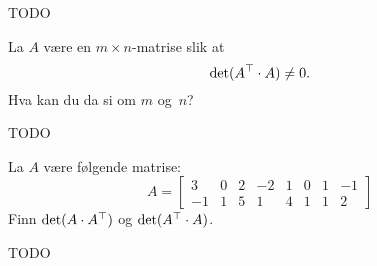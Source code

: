 \begin{losning}
TODO
\end{losning}


\begin{oppgave}
La $A$ være en $m \times n$-matrise slik at
\[
\det (A^\top \cdot A) \ne 0.
\]
Hva kan du da si om $m$ og~$n$?
\end{oppgave}

\begin{losning}
TODO
\end{losning}


\begin{oppgave}
La $A$ være følgende matrise:
\[
A =
\begin{bmatrix}
 3 & 0 & 2 & -2 & 1 & 0 & 1 & -1 \\
-1 & 1 & 5 &  1 & 4 & 1 & 1 &  2
\end{bmatrix}
\]
Finn $\det (A \cdot A^\top)$ og $\det (A^\top \cdot A)$.
\end{oppgave}

\begin{losning}
TODO
\end{losning}


